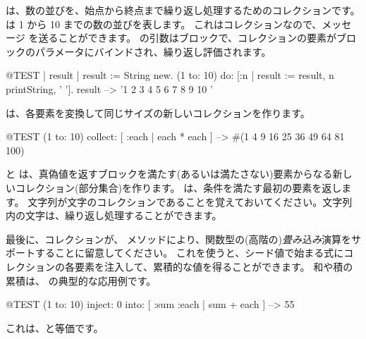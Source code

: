 \documentclass[a4paper,10pt,twoside]{book}
\begin{document}
 は、数の並びを、始点から終点まで繰り返し処理するためのコレクションです。
は 1 から 10 までの数の並びを表します。
これはコレクションなので、メッセージ  を送ることができます。
 の引数はブロックで、コレクションの要素がブロックのパラメータにバインドされ、繰り返し評価されます。

\begin{code}{@TEST | result |}
result := String new.
(1 to: 10) do: [:n | result := result, n printString, ' '].
result --> '1 2 3 4 5 6 7 8 9 10 '
\end{code}


 は、各要素を変換して同じサイズの新しいコレクションを作ります。
\begin{code}{@TEST}
(1 to: 10) collect: [ :each | each * each ] --> #(1 4 9 16 25 36 49 64 81 100)
\end{code}

 と  は、真偽値を返すブロックを満たす(あるいは満たさない)要素からなる新しいコレクション(部分集合)を作ります。
 は、条件を満たす最初の要素を返します。
文字列が文字のコレクションであることを覚えておいてください。文字列内の文字は、繰り返し処理することができます。


最後に、コレクションが、 メソッドにより、関数型の(高階の)\emph{畳み込み}演算をサポートすることに留意してください。
これを使うと、シード値で始まる式にコレクションの各要素を注入して、累積的な値を得ることができます。
和や積の累積は、 の典型的な応用例です。

\begin{code}{@TEST}
(1 to: 10) inject: 0 into: [ :sum :each | sum + each ] --> 55
\end{code}

\noindent
これは、と等価です。
\end{document}
